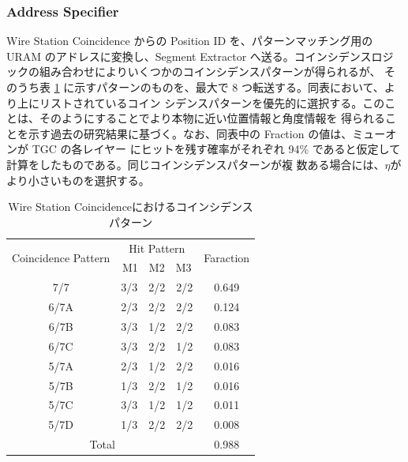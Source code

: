 \subsubsection*{Address Specifier}
Wire Station Coincidence からの Position ID を、パターンマッチング用の URAM のアドレスに変換し、Segment
Extractor へ送る。コインシデンスロジックの組み合わせによりいくつかのコインシデンスパターンが得られるが、 そのうち表 \ref{tab:StationCoin_wire} に示すパターンのものを、最大で 8 つ転送する。同表において、より上にリストされているコイン シデンスパターンを優先的に選択する。このことは、そのようにすることでより本物に近い位置情報と角度情報を 得られることを示す過去の研究結果に基づく。なお、同表中の Fraction の値は、ミューオンが TGC の各レイヤー にヒットを残す確率がそれぞれ 94\% であると仮定して計算をしたものである。同じコインシデンスパターンが複 数ある場合には、$\eta$がより小さいものを選択する。

\begin{table}[h]
    \centering
    \caption{Wire Station Coincidenceにおけるコインシデンスパターン}
    \label{tab:StationCoin_wire}
    \begin{tabular}{|cc|c|}
    \hline
    \multicolumn{1}{|c|}{\multirow{2}{*}{Coincidence Pattern}} & Hit Pattern & \multirow{2}{*}{Faraction} \\ \cline{2-2}
    \multicolumn{1}{|c|}{}                                     & M1　M2　M3    &                            \\ \hline\hline
    \multicolumn{1}{|c|}{7/7}                                  & 3/3　2/2　2/2 & 0.649                      \\ \hline
    \multicolumn{1}{|c|}{6/7A}                                 & 2/3　2/2　2/2 & 0.124                      \\ \hline
    \multicolumn{1}{|c|}{6/7B}                                 & 3/3　1/2　2/2 & 0.083                      \\ \hline
    \multicolumn{1}{|c|}{6/7C}                        & 3/3　2/2　1/2 & 0.083                      \\ \hline
    \multicolumn{1}{|c|}{5/7A}                                 & 2/3　1/2　2/2 & 0.016                      \\ \hline
    \multicolumn{1}{|c|}{5/7B}                                 & 1/3　2/2　1/2 & 0.016                      \\ \hline
    \multicolumn{1}{|c|}{5/7C}                                 & 3/3　1/2　1/2 & 0.011                      \\ \hline
    \multicolumn{1}{|c|}{5/7D}                                 & 1/3　2/2　2/2 & 0.008                      \\ \hline\hline
    \multicolumn{2}{|c|}{Total}                                              & 0.988                      \\ \hline
    \end{tabular}
    \end{table}

